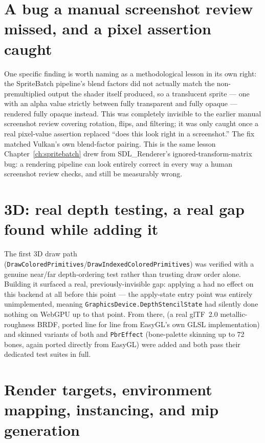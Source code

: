\section{A bug a manual screenshot review missed, and a pixel assertion caught}

One specific finding is worth naming as a methodological lesson in its own right: the
SpriteBatch pipeline's blend factors did not actually match the non-premultiplied output the
shader itself produced, so a translucent sprite --- one with an alpha value strictly between
fully transparent and fully opaque --- rendered fully opaque instead. This was completely
invisible to the earlier manual screenshot review covering rotation, flips, and filtering; it
was only caught once a real pixel-value assertion replaced ``does this look right in a
screenshot.'' The fix matched Vulkan's own blend-factor pairing. This is the same lesson
Chapter~\ref{ch:spritebatch} drew from SDL\_Renderer's ignored-transform-matrix bug: a
rendering pipeline can look entirely correct in every way a human screenshot review checks,
and still be measurably wrong.

\section{3D: real depth testing, a real gap found while adding it}

The first 3D draw path (\texttt{DrawColoredPrimitives}/\texttt{DrawIndexedColoredPrimitives})
was verified with a genuine near/far depth-ordering test rather than trusting draw order
alone. Building it surfaced a real, previously-invisible gap: applying a
 had no effect on this backend at all before this point --- the
apply-state entry point was entirely unimplemented, meaning
\texttt{GraphicsDevice.DepthStencilState} had silently done nothing on WebGPU up to that
point. From there,  (a real glTF~2.0 metallic-roughness BRDF, ported line
for line from EasyGL's own GLSL implementation) and skinned variants of both
 and \texttt{PbrEffect} (bone-palette skinning up to 72 bones, again
ported directly from EasyGL) were added and both pass their dedicated test suites in full.

\section{Render targets, environment mapping, instancing, and mip generation}

